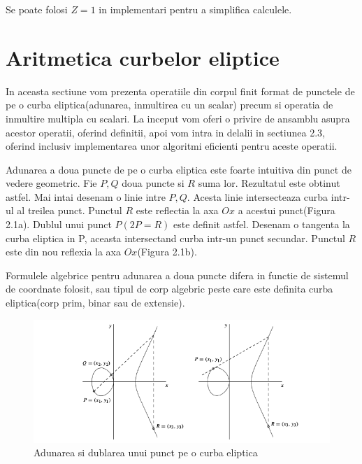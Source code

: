 \begin{obs}
Se poate folosi $Z = 1$ in implementari pentru a simplifica calculele.
\end{obs}

\section{Aritmetica curbelor eliptice}
\label{sec:sec02}
In aceasta sectiune vom prezenta operatiile din corpul finit format de punctele de pe o curba eliptica(adunarea,  inmultirea cu un scalar) precum si operatia de inmultire multipla cu scalari. La inceput vom oferi o privire de ansamblu asupra acestor operatii, oferind definitii, apoi vom intra in delalii in sectiunea 2.3, oferind inclusiv implementarea unor algoritmi eficienti pentru aceste operatii.

\begin{dfn}
Adunarea a doua puncte de pe o curba eliptica este foarte intuitiva din punct de vedere geometric. Fie $P, Q$ doua puncte si $R$ suma lor. Rezultatul este obtinut astfel. Mai intai desenam o linie intre $P, Q$. Acesta linie intersecteaza curba intr-ul al treilea punct. Punctul $R$ este reflectia la axa $Ox$ a acestui punct(Figura 2.1a). Dublul unui punct $P(2P = R)$ este definit astfel. Desenam o tangenta la curba eliptica in P, aceasta intersectand curba intr-un punct secundar. Punctul $R$ este din nou reflexia la axa $Ox$(Figura 2.1b).  
\end{dfn}

\begin{obs}
Formulele algebrice pentru adunarea a doua puncte difera in functie de sistemul de coordnate folosit, sau tipul de corp algebric peste care este definita curba eliptica(corp prim, binar sau de extensie).
\end{obs}

\begin{figure}[htp]
\centering
\includegraphics[width=13cm]{chapters/Addition.png}
\caption{Adunarea si dublarea unui punct pe o curba eliptica}
\label{fig:lion}
\end{figure}

